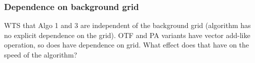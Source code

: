 \subsubsection{Dependence on background grid}
\bgroup\color{red}
WTS that Algo 1 and 3 are independent of the background grid (algorithm has
no explicit dependence on the grid). OTF and PA variants have vector add-like
operation, so does have dependence on grid. What effect does that have on the
speed of the algorithm?
\egroup

%
%


